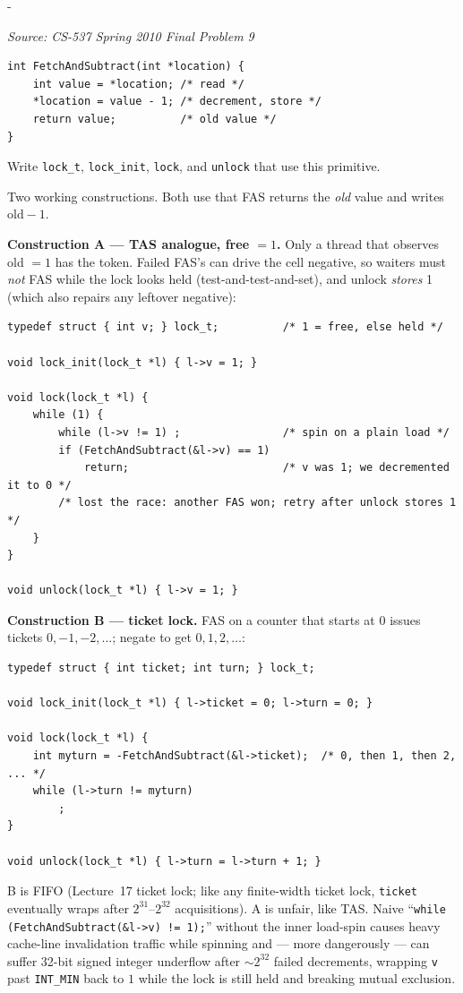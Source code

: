\documentclass[11pt,a4paper]{article}
\makeatletter
\newcommand{\keepspace}[1]{\par\penalty-100\begingroup
  \setlength{\dimen@}{#1}\dimen@ii\pagegoal\advance\dimen@ii-\pagetotal
  \ifdim\dimen@>\dimen@ii\ifdim\dimen@ii>\z@\vfil\fi\break\fi\endgroup}
\newcounter{qn}[section]
\newenvironment{Qn}[4]{%
  \refstepcounter{qn}\keepspace{7\baselineskip}%
  \begin{tcolorbox}[qboxstyle, title={Q\thesection.\theqn\ \ [#1 \textbar\ #2]\ \ #4}]%
  {\footnotesize\color{g3}\textit{Source: #3}}\par\smallskip%
}{%
  \end{tcolorbox}%
}
\newenvironment{Sol}{%
  \begin{tcolorbox}[sboxstyle, title={Solution}]%
}{%
  \end{tcolorbox}\vspace{0.35em}%
}
\makeatother
\begin{document}
\begin{Qn}{Hard}{Lect 17}{CS-537 Spring 2010 Final Problem 9}{Build a lock from \texttt{FetchAndSubtract}}
\begin{lstlisting}[numbers=none]
int FetchAndSubtract(int *location) {
    int value = *location; /* read */
    *location = value - 1; /* decrement, store */
    return value;          /* old value */
}
\end{lstlisting}

Write \texttt{lock\_t}, \texttt{lock\_init}, \texttt{lock}, and \texttt{unlock} that use this primitive.
\end{Qn}
\begin{Sol}
Two working constructions. Both use that FAS returns the \emph{old} value and writes $\mathrm{old}-1$.

\textbf{Construction A --- TAS analogue, free $=1$.} Only a thread that observes old $=1$ has the token. Failed FAS's can drive the cell negative, so waiters must \emph{not} FAS while the lock looks held (test-and-test-and-set), and unlock \emph{stores} 1 (which also repairs any leftover negative):

\begin{lstlisting}[numbers=none]
typedef struct { int v; } lock_t;          /* 1 = free, else held */

void lock_init(lock_t *l) { l->v = 1; }

void lock(lock_t *l) {
    while (1) {
        while (l->v != 1) ;                /* spin on a plain load */
        if (FetchAndSubtract(&l->v) == 1)
            return;                        /* v was 1; we decremented it to 0 */
        /* lost the race: another FAS won; retry after unlock stores 1 */
    }
}

void unlock(lock_t *l) { l->v = 1; }
\end{lstlisting}

\textbf{Construction B --- ticket lock.} FAS on a counter that starts at 0 issues tickets $0,-1,-2,\ldots$; negate to get $0,1,2,\ldots$:

\begin{lstlisting}[numbers=none]
typedef struct { int ticket; int turn; } lock_t;

void lock_init(lock_t *l) { l->ticket = 0; l->turn = 0; }

void lock(lock_t *l) {
    int myturn = -FetchAndSubtract(&l->ticket);  /* 0, then 1, then 2, ... */
    while (l->turn != myturn)
        ;
}

void unlock(lock_t *l) { l->turn = l->turn + 1; }
\end{lstlisting}

B is FIFO (Lecture~17 ticket lock; like any finite-width ticket lock, \texttt{ticket} eventually wraps after $2^{31}$--$2^{32}$ acquisitions). A is unfair, like TAS. Naive ``\texttt{while (FetchAndSubtract(\&l->v) != 1);}'' without the inner load-spin causes heavy cache-line invalidation traffic while spinning and --- more dangerously --- can suffer 32-bit signed integer underflow after $\sim 2^{32}$ failed decrements, wrapping \texttt{v} past \texttt{INT\_MIN} back to $1$ while the lock is still held and breaking mutual exclusion.
\end{Sol}
\end{document}
